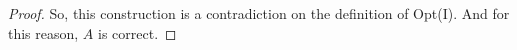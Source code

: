\documentclass{article}
\begin{document}
\begin{proof}
    So, this construction is a contradiction on the definition of Opt(I).
    And for this reason, $A$ is correct.
    
%	
%
%	
%	
%		
%	
%	
%	
	\end{proof}
\end{document}
